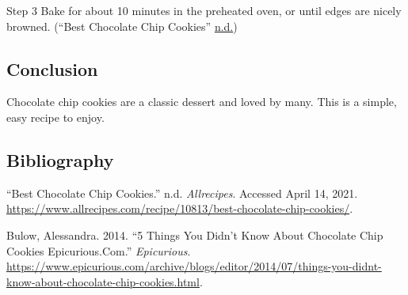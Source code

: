 \documentclass[
]{article}
\begin{document}
Step 3
Bake for about 10 minutes in the preheated oven, or until edges are nicely browned.
(``Best Chocolate Chip Cookies'' \protect\hyperlink{ref-recipe}{n.d.})

\hypertarget{conclusion}{%
\subsection{Conclusion}\label{conclusion}}

Chocolate chip cookies are a classic dessert and loved by many. This is a simple, easy recipe to enjoy.

\hypertarget{bibliography}{%
\subsection*{Bibliography}\label{bibliography}}

\hypertarget{refs}{}
\leavevmode\hypertarget{ref-recipe}{}%
``Best Chocolate Chip Cookies.'' n.d. \emph{Allrecipes}. Accessed April 14, 2021. \url{https://www.allrecipes.com/recipe/10813/best-chocolate-chip-cookies/}.

\leavevmode\hypertarget{ref-historical}{}%
Bulow, Alessandra. 2014. ``5 Things You Didn't Know About Chocolate Chip Cookies Epicurious.Com.'' \emph{Epicurious}. \url{https://www.epicurious.com/archive/blogs/editor/2014/07/things-you-didnt-know-about-chocolate-chip-cookies.html}.
\end{document}
